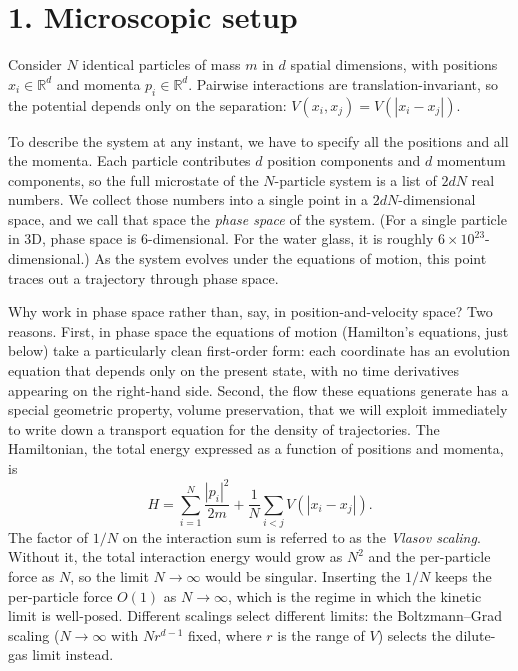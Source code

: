 \documentclass{article}
\begin{document}
\section*{1. Microscopic setup}

Consider \(N\) identical particles of mass \(m\) in \(d\) spatial dimensions, with positions \(x_i \in \mathbb{R}^d\) and momenta \(p_i \in \mathbb{R}^d\). Pairwise interactions are translation-invariant, so the potential depends only on the separation: \(V(x_i, x_j) = V(|x_i - x_j|)\).

To describe the system at any instant, we have to specify all the positions and all the momenta. Each particle contributes \(d\) position components and \(d\) momentum components, so the full microstate of the \(N\)-particle system is a list of \(2dN\) real numbers. We collect those numbers into a single point in a \(2dN\)-dimensional space, and we call that space the \emph{phase space} of the system. (For a single particle in 3D, phase space is 6-dimensional. For the water glass, it is roughly \(6 \times 10^{23}\)-dimensional.) As the system evolves under the equations of motion, this point traces out a trajectory through phase space.

Why work in phase space rather than, say, in position-and-velocity space? Two reasons. First, in phase space the equations of motion (Hamilton's equations, just below) take a particularly clean first-order form: each coordinate has an evolution equation that depends only on the present state, with no time derivatives appearing on the right-hand side. Second, the flow these equations generate has a special geometric property, volume preservation, that we will exploit immediately to write down a transport equation for the density of trajectories. The Hamiltonian, the total energy expressed as a function of positions and momenta, is
\begin{equation}
H = \sum_{i=1}^N \frac{|p_i|^2}{2m} + \frac{1}{N} \sum_{i<j} V(|x_i - x_j|).
\label{eq:hamiltonian}
\end{equation}
The factor of \(1/N\) on the interaction sum is referred to as the \emph{Vlasov scaling}. Without it, the total interaction energy would grow as \(N^2\) and the per-particle force as \(N\), so the limit \(N \to \infty\) would be singular. Inserting the \(1/N\) keeps the per-particle force \(O(1)\) as \(N \to \infty\), which is the regime in which the kinetic limit is well-posed. Different scalings select different limits: the Boltzmann--Grad scaling (\(N \to \infty\) with \(N r^{d-1}\) fixed, where \(r\) is the range of \(V\)) selects the dilute-gas limit instead.
\end{document}

